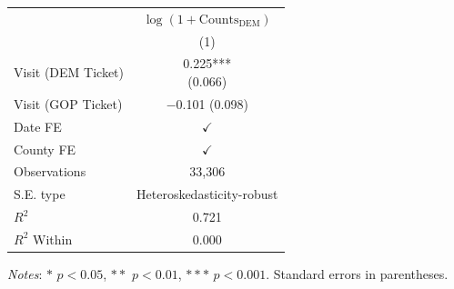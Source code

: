 \renewcommand\cellalign{t}
\begin{threeparttable}
\begin{tabular}{lc}
\toprule
 & \multicolumn{1}{c}{$\log(1+\text{Counts}_{\text{DEM}})$} \\
\cmidrule(lr){2-2}
 & (1) \\
\midrule
\addlinespace
Visit (DEM Ticket) & \makecell{0.225*** \\ (0.066)} \\
Visit (GOP Ticket) & \makecell{$-$0.101 \\ (0.098)} \\
\midrule
\addlinespace
Date FE   & $\checkmark$ \\
County FE & $\checkmark$ \\
\midrule
\addlinespace
Observations & 33,306 \\
S.E. type    & Heteroskedasticity-robust \\
$R^2$        & 0.721 \\
$R^2$ Within & 0.000 \\
\bottomrule
\end{tabular}
\begin{tablenotes}
\footnotesize
\item \textit{Notes}: $*$ $p<0.05$, $**$ $p<0.01$, $***$ $p<0.001$.
      Standard errors in parentheses.
\end{tablenotes}
\end{threeparttable}
